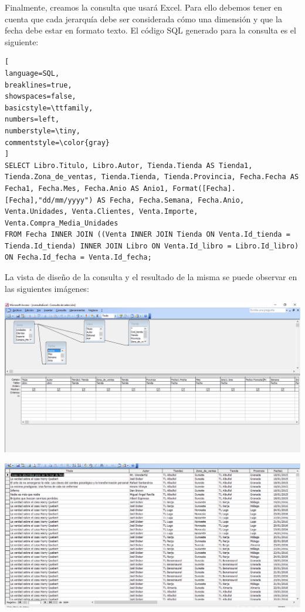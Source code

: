 \documentclass[paper=a4, fontsize=11pt, spanish]{scrartcl}
\numberwithin{equation}{section} %
\numberwithin{figure}{section} %
\numberwithin{table}{section} %
\begin{document}
Finalmente, creamos la consulta que usará Excel. Para ello debemos tener en cuenta que cada jerarquía debe ser considerada cómo una dimensión y que la fecha debe estar en formato texto. 
El código SQL generado para la consulta es el siguiente:

\begin{lstlisting}[
language=SQL,
breaklines=true,
showspaces=false,
basicstyle=\ttfamily,
numbers=left,
numberstyle=\tiny,
commentstyle=\color{gray}
]
SELECT Libro.Titulo, Libro.Autor, Tienda.Tienda AS Tienda1, Tienda.Zona_de_ventas, Tienda.Tienda, Tienda.Provincia, Fecha.Fecha AS Fecha1, Fecha.Mes, Fecha.Anio AS Anio1, Format([Fecha].[Fecha],"dd/mm/yyyy") AS Fecha, Fecha.Semana, Fecha.Anio, Venta.Unidades, Venta.Clientes, Venta.Importe, Venta.Compra_Media_Unidades
FROM Fecha INNER JOIN ((Venta INNER JOIN Tienda ON Venta.Id_tienda = Tienda.Id_tienda) INNER JOIN Libro ON Venta.Id_libro = Libro.Id_libro) ON Fecha.Id_fecha = Venta.Id_fecha;
\end{lstlisting}
La vista de diseño de la consulta y el resultado de la misma se puede observar en las siguientes imágenes:\\
\begin{center}
	\includegraphics[scale=0.5]{img5.png}
	
	\medskip
	
	\includegraphics[scale=0.5]{img6.png}
\end{center}
\end{document}
